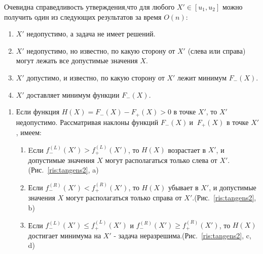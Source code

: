\documentclass[12pt,a4paper]{article}
\begin{document}
Очевидна справедливость утверждения,что для любого $X'\in [u_{1},u_{2}]$ можно получить один из следующих результатов за время $O(n)$:
\begin{enumerate}
\item $X'$ недопустимо, а задача не имеет решений.
\item $X'$ недопустимо, но известно, по какую сторону от $X'$ (слева или справа) могут лежать все допустимые значения $X$.
\item $X'$ допустимо, и известно, по какую сторону от $X'$ лежит минимум $F_{-}(X)$.
\item $X'$ доставляет минимум функции $F_{-}(X)$.
\end{enumerate}



\newpage
\begin{enumerate}
\item Если функция $H(X)=F_{-}(X)-F_{+}(X)>0$  в точке $X'$, то $X'$ недопустимо. Рассматривая наклоны функций $F_{-}(X)\ \text{и }\ F_{+}(X)$ в точке $X'$, имеем: \par 
\begin{enumerate}
\item Eсли $f_{-}^{(L)}(X')>f_{+}^{(L)}(X')$, то $H(X)$ возрастает в $X'$, и допустимые значения $X$ могут располагаться только слева от $X'$. (Рис.~\ref{ris:tangens2}, a)
\item Если $f_{-}^{(R)}(X')<f_{+}^{(R)}(X')$, то $H(X)$ убывает в $X'$, и допустимые значения $X$ могут располагаться только справа от $X'$.(Рис.~\ref{ris:tangens2}, b)
\item Если $f_{-}^{(L)}(X')\leqslant f_{+}^{(L)}(X')$ и $f_{-}^{(R)}(X')\geqslant f_{+}^{(R)}(X')$, то $H(X)$ достигает минимума на $X'$ - задача неразрешима.(Рис.~\ref{ris:tangens2}, c, d)\par
\end{enumerate}


\end{enumerate}
\end{document}
